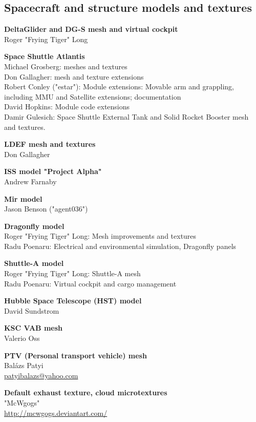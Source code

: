 \documentclass[Orbiter User Manual.tex]{subfiles}
\begin{document}
\subsection{Spacecraft and structure models and textures}
\textbf{DeltaGlider and DG-S mesh and virtual cockpit}\\
Roger "Frying Tiger" Long

\textbf{Space Shuttle Atlantis}\\
Michael Grosberg: meshes and textures\\
Don Gallagher: mesh and texture extensions\\
Robert Conley ("estar"): Module extensions: Movable arm and grappling, including
MMU and Satellite extensions; documentation\\
David Hopkins: Module code extensions\\
Damir Gulesich: Space Shuttle External Tank and Solid Rocket Booster mesh and
textures.

\textbf{LDEF mesh and textures}\\
Don Gallagher

\textbf{ISS model "Project Alpha"}\\
Andrew Farnaby

\textbf{Mir model}\\
Jason Benson ("agent036")

\textbf{Dragonfly model}\\
Roger "Frying Tiger" Long: Mesh improvements and textures\\
Radu Poenaru: Electrical and environmental simulation, Dragonfly panels

\textbf{Shuttle-A model}\\
Roger "Frying Tiger" Long: Shuttle-A mesh\\
Radu Poenaru: Virtual cockpit and cargo management

\textbf{Hubble Space Telescope (HST) model}\\
David Sundstrom

\textbf{KSC VAB mesh}\\
Valerio Oss

\textbf{PTV (Personal transport vehicle) mesh}\\
Balázs Patyi\\
\href{mailto:patyibalazs@yahoo.com}{patyibalazs@yahoo.com}

\textbf{Default exhaust texture, cloud microtextures}\\
"McWgogs"\\
\url{http://mcwgogs.deviantart.com/}
\end{document}
